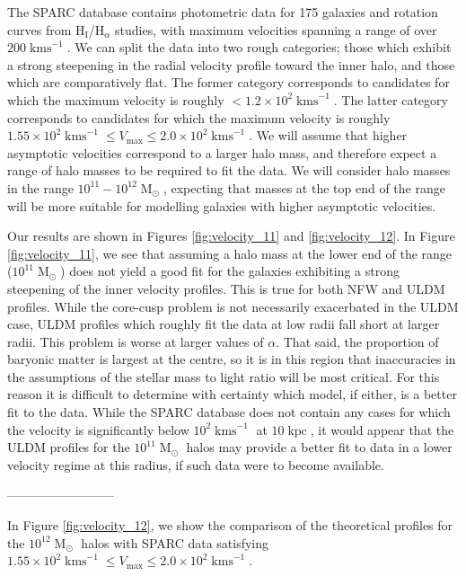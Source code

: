 \documentclass[a4paper,11pt]{article}
\begin{document}
The SPARC database contains photometric data for 175 galaxies and rotation curves from $\mathrm{H}_{\mathrm{I}}$/$\mathrm{H}_{\alpha}$ studies, with maximum velocities spanning a range of over $200 \operatorname{kms}^{-1}$. We can split the data into two rough categories; those which exhibit a strong steepening in the radial velocity profile toward the inner halo, and those which are comparatively flat. The former category corresponds to candidates for which the maximum velocity is roughly $< 1.2\times 10^2 \operatorname{kms}^{-1}$. The latter category corresponds to candidates for which the maximum velocity is roughly $1.55\times 10^2 \operatorname{kms}^{-1}\leq V_{\mathrm{max}}\leq 2.0\times 10^2 \operatorname{kms}^{-1}$. We will assume that higher asymptotic velocities correspond to a larger halo mass, and therefore expect a range of halo masses to be required to fit the data. We will consider halo masses in the range $10^{11} - 10^{12} \operatorname{M}_{\odot}$, expecting that masses at the top end of the range will be more suitable for modelling galaxies with higher asymptotic velocities. 

Our results are shown in Figures \ref{fig:velocity_11} and \ref{fig:velocity_12}. In Figure \ref{fig:velocity_11}, we see that assuming a halo mass at the lower end of the range ($10^{11}\operatorname{M}_{\odot}$) does not yield a good fit for the galaxies exhibiting a strong steepening of the inner velocity profiles. This is true for both NFW and ULDM profiles. While the core-cusp problem is not necessarily exacerbated in the ULDM case, ULDM profiles which roughly fit the data at low radii fall short at larger radii. This problem is worse at larger values of $\alpha$. That said, the proportion of baryonic matter is largest at the centre, so it is in this region that inaccuracies in the assumptions of the stellar mass to light ratio will be most critical. For this reason it is difficult to determine with certainty which model, if either, is a better fit to the data. While the SPARC database does not contain any cases for which the velocity is significantly below $10^2\operatorname{kms}^{-1}$ at $10 \operatorname{kpc}$, it would appear that the ULDM profiles for the $10^{11}\operatorname{M}_{\odot}$ halos may provide a better fit to data in a lower velocity regime at this radius, if such data were to become available.  




--------------------------


In Figure \ref{fig:velocity_12}, we show the comparison of the theoretical profiles for the $10^{12}\operatorname{M}_{\odot}$ halos with SPARC data satisfying $1.55 \times 10^2 \operatorname{kms}^{-1}\leq V_{\mathrm{max}}\leq 2.0 \times 10^2 \operatorname{kms}^{-1}$.
\end{document}

